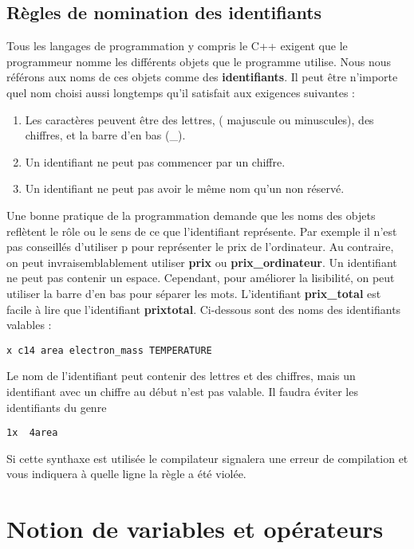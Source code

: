 \documentclass[a4paper, oneside,11pt]{book}
\begin{document}
\section{R\`egles de nomination des identifiants}
 Tous les langages de programmation y compris le C++ exigent que le programmeur nomme les diff\'erents objets que le programme utilise. 
 Nous nous r\'ef\'erons aux noms de ces objets comme  des \textbf{identifiants}. Il peut \^etre    n'importe quel nom choisi aussi longtemps qu'il 
 satisfait aux exigences suivantes : 

\begin{enumerate}
\item Les caract\`eres peuvent \^etre des lettres, ( majuscule ou minuscules), des chiffres, et la barre d'en bas (\_).
\item Un identifiant ne peut pas commencer par un chiffre.
\item Un identifiant ne peut pas avoir le m\^eme nom qu'un non r\'eserv\'e.

\end{enumerate}

Une  bonne pratique de la programmation demande que les noms des objets refl\`etent le r\^ole ou le sens de ce que l'identifiant repr\'esente. Par exemple il   n'est pas conseill\'es 
d'utiliser p pour repr\'esenter  le prix de l'ordinateur. Au contraire, on peut invraisemblablement utiliser \textbf{prix} ou \textbf{prix\_ordinateur}. Un identifiant ne peut pas
contenir un espace. Cependant, pour am\'eliorer la lisibilit\'e, on peut utiliser la barre d'en bas pour s\'eparer les mots. L'identifiant \textbf{prix\_total} est facile \`a lire
que l'identifiant \textbf{prixtotal}. Ci-dessous sont des noms des identifiants valables : 

\begin{lstlisting}
x c14 area electron_mass TEMPERATURE 
\end{lstlisting}


Le nom de l'identifiant peut contenir des lettres et des chiffres, mais un identifiant avec un chiffre au d\'ebut n'est pas valable. Il faudra \'eviter les identifiants du genre

\begin{lstlisting}
1x  4area 
\end{lstlisting}
Si cette synthaxe est utilis\'ee le compilateur signalera une erreur de compilation et vous indiquera \`a quelle ligne la r\`egle a \'et\'e viol\'ee.



\chapter{Notion de variables et op\'erateurs}
\pagestyle{fancy}
\renewcommand{\chaptermark}[1]{\markboth{#1}{}}
 \rhead{\thepage}
\end{document}
